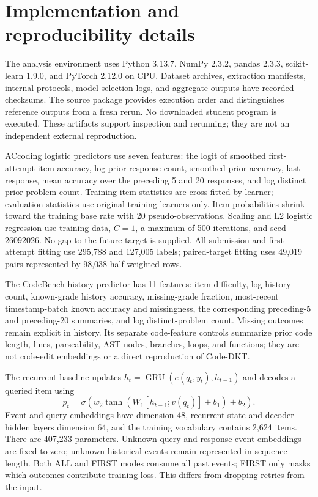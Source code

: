 \documentclass[11pt]{article}
\newcommand{\1}{\mathbb{I}}
\begin{document}
\appendix
\section{Implementation and reproducibility details}
The analysis environment uses Python 3.13.7, NumPy 2.3.2, pandas 2.3.3, scikit-learn 1.9.0, and PyTorch 2.12.0 on CPU. Dataset archives, extraction manifests, internal protocols, model-selection logs, and aggregate outputs have recorded checksums. The source package provides execution order and distinguishes reference outputs from a fresh rerun. No downloaded student program is executed. These artifacts support inspection and rerunning; they are not an independent external reproduction.

ACcoding logistic predictors use seven features: the logit of smoothed first-attempt item accuracy, log prior-response count, smoothed prior accuracy, last response, mean accuracy over the preceding 5 and 20 responses, and log distinct prior-problem count. Training item statistics are cross-fitted by learner; evaluation statistics use original training learners only. Item probabilities shrink toward the training base rate with 20 pseudo-observations. Scaling and L2 logistic regression use training data, $C=1$, a maximum of 500 iterations, and seed 26092026. No gap to the future target is supplied. All-submission and first-attempt fitting use 295,788 and 127,005 labels; paired-target fitting uses 49,019 pairs represented by 98,038 half-weighted rows.

The CodeBench history predictor has 11 features: item difficulty, log history count, known-grade history accuracy, missing-grade fraction, most-recent timestamp-batch known accuracy and missingness, the corresponding preceding-5 and preceding-20 summaries, and log distinct-problem count. Missing outcomes remain explicit in history. Its separate code-feature controls summarize prior code length, lines, parseability, AST nodes, branches, loops, and functions; they are not code-edit embeddings or a direct reproduction of Code-DKT.

The recurrent baseline updates $h_t=\operatorname{GRU}(e(q_t,y_t),h_{t-1})$ and decodes a queried item using
\begin{equation}
 p_t=\sigma\left(w_2\tanh\left(W_1[h_{t-1};v(q_t)]+b_1\right)+b_2\right).
\end{equation}
Event and query embeddings have dimension 48, recurrent state and decoder hidden layers dimension 64, and the training vocabulary contains 2,624 items. There are 407,233 parameters. Unknown query and response-event embeddings are fixed to zero; unknown historical events remain represented in sequence length. Both ALL and FIRST modes consume all past events; FIRST only masks which outcomes contribute training loss. This differs from dropping retries from the input.
\end{document}
